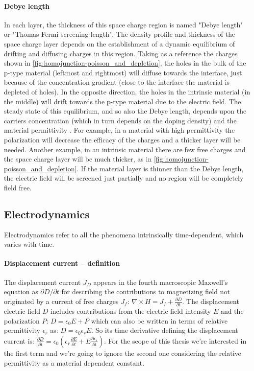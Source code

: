 		\paragraph{Debye length}\label{intro-debye_length}
		In each layer, the thickness of this space charge region is named "Debye length" or "Thomas\hyp{}Fermi screening length".
The density profile and thickness of the space charge layer depends on the establishment of a dynamic equilibrium of drifting and diffusing charges in this region.
Taking as a reference the charges shown in \cref{fig:homojunction-poisson_and_depletion}, the holes in the bulk of the p-type material (leftmost and rightmost) will diffuse towards the interface, just because of the concentration gradient (close to the interface the material is depleted of holes).
In the opposite direction, the holes in the intrinsic material (in the middle) will drift towards the p-type material due to the electric field.
The steady state of this equilibrium, and so also the Debye length, depends upon the carriers concentration (which in turn depends on the doping density) and the material permittivity \cite{WikipediaDebye2019}.
		For example, in a material with high permittivity the polarization will decrease the efficacy of the charges and a thicker layer will be needed.
		Another example, in an intrinsic material there are few free charges and the space charge layer will be much thicker, as in \cref{fig:homojunction-poisson_and_depletion}.
If the material layer is thinner than the Debye length, the electric field will be screened just partially and no region will be completely field free.
		
	\subsection{Electrodynamics}
	Electrodynamics refer to all the phenomena intrinsically time-dependent, which varies with time.

		\paragraph{Displacement current -- definition}\label{intro_displacement_current} The displacement current $J_D$ appears in the fourth macroscopic Maxwell's equation as $\partial D / \partial t$ for describing the contributions to magnetizing field not originated by a current of free charges $J_f$: $\nabla \times H = J_f + \frac{\partial D}{\partial t}$.
		The displacement electric field $D$ includes contributions from the electric field intensity $E$ and the polarization $P$: $D=\epsilon_0 E + P$ which can also be written in terms of relative permittivity $\epsilon_r$ as: $D= \epsilon_0 \epsilon_r E$.
		So its time derivative defining the displacement current is: $\frac{\partial D}{\partial t} = \epsilon_0 (\epsilon_r\frac{\partial E}{\partial t} + E\frac{\partial \epsilon_r}{\partial t})$.
		For the scope of this thesis we're interested in the first term and we're going to ignore the second one considering the relative permittivity as a material dependent constant.


